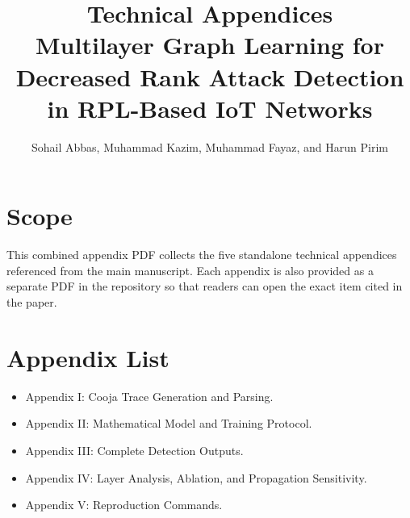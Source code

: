 \documentclass[10pt]{article}
\title{\vspace{-1.2cm}Technical Appendices\\
\large Multilayer Graph Learning for Decreased Rank Attack Detection in RPL-Based IoT Networks}
\author{Sohail Abbas, Muhammad Kazim, Muhammad Fayaz, and Harun Pirim}
\date{}
\begin{document}
\maketitle

\section*{Scope}
This combined appendix PDF collects the five standalone technical appendices
referenced from the main manuscript. Each appendix is also provided as a
separate PDF in the repository so that readers can open the exact item cited in
the paper.

\section*{Appendix List}
\begin{itemize}
\item Appendix I: Cooja Trace Generation and Parsing.
\item Appendix II: Mathematical Model and Training Protocol.
\item Appendix III: Complete Detection Outputs.
\item Appendix IV: Layer Analysis, Ablation, and Propagation Sensitivity.
\item Appendix V: Reproduction Commands.
\end{itemize}






\end{document}
